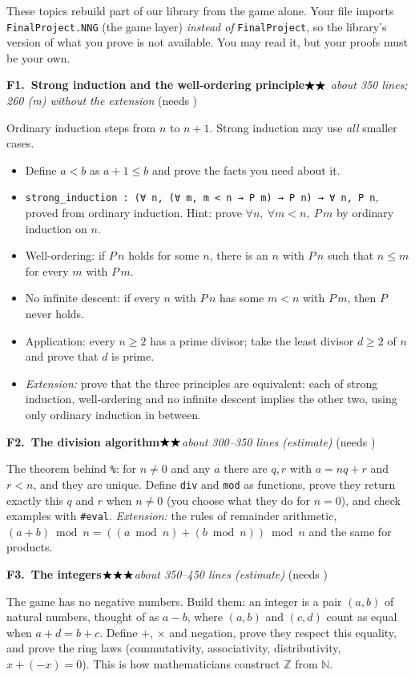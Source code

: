 \documentclass[11pt]{article}
\newcommand{\lean}[1]{\texttt{#1}}
\newcommand{\N}{\ensuremath{\mathbb{N}}}
\newcommand{\stars}[1]{\ensuremath{%
  \ifcase#1\or\bigstar\or\bigstar\bigstar\or\bigstar\bigstar\bigstar\or
  \bigstar\bigstar\bigstar\bigstar\or\bigstar\bigstar\bigstar\bigstar\bigstar\fi}}
\newcommand{\topic}[5]{%
  \par\medskip\noindent\textbf{#1.\ #2}\hfill\quad\stars{#3}\enspace\textit{#4}%
  \ifx\relax#5\relax\else\enspace(needs #5)\fi\par\nopagebreak}
\begin{document}
These topics rebuild part of our library from the game alone. Your file imports
\lean{FinalProject.NNG} (the game layer) \emph{instead of} \lean{FinalProject}, so the library's
version of what you prove is not available. You may read it, but your proofs must be your own.

\topic{F1}{Strong induction and the well-ordering principle}{2}{%
about 350 lines; 260 (m) without the extension}{}
Ordinary induction steps from $n$ to $n+1$. Strong induction may use \emph{all} smaller cases.
\begin{itemize}
\item Define $a < b$ as $a + 1 \le b$ and prove the facts you need about it.
\item \lean{strong\_induction : (∀ n, (∀ m, m < n → P m) → P n) → ∀ n, P n}, proved from ordinary
  induction. Hint: prove $\forall n,\ \forall m < n,\ P\,m$ by ordinary induction on $n$.
\item Well-ordering: if $P\,n$ holds for some $n$, there is an $n$ with $P\,n$ such that
  $n \le m$ for every $m$ with $P\,m$.
\item No infinite descent: if every $n$ with $P\,n$ has some $m < n$ with $P\,m$, then $P$ never
  holds.
\item Application: every $n \ge 2$ has a prime divisor; take the least divisor $d \ge 2$ of $n$
  and prove that $d$ is prime.
\item \emph{Extension:} prove that the three principles are equivalent: each of strong
  induction, well-ordering and no infinite descent implies the other two, using only ordinary
  induction in between.
\end{itemize}

\topic{F2}{The division algorithm}{2}{about 300--350 lines (estimate)}{}
The theorem behind \lean{\%}: for $n \ne 0$ and any $a$ there are $q, r$ with $a = nq + r$ and
$r < n$, and they are unique. Define \lean{div} and \lean{mod} as functions, prove they return
exactly this $q$ and $r$ when $n \ne 0$ (you choose what they do for $n = 0$), and check examples
with \lean{\#eval}.
\emph{Extension:} the rules of remainder arithmetic, $(a + b) \bmod n = ((a \bmod n) +
(b \bmod n)) \bmod n$ and the same for products.

\topic{F3}{The integers}{3}{about 350--450 lines (estimate)}{}
The game has no negative numbers. Build them: an integer is a pair $(a, b)$ of natural numbers,
thought of as $a - b$, where $(a, b)$ and $(c, d)$ count as equal when $a + d = b + c$. Define
$+$, $\times$ and negation, prove they respect this equality, and prove the ring laws
(commutativity, associativity, distributivity, $x + (-x) = 0$). This is how mathematicians
construct $\mathbb{Z}$ from \N.
\end{document}
